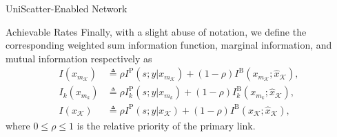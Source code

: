 \documentclass[journal]{IEEEtran}
\begin{document}
\begin{section}{UniScatter-Enabled Network}
\begin{subsection}{Achievable Rates}
		Finally, with a slight abuse of notation, we define the corresponding weighted sum information function, marginal information, and mutual information respectively as
		\begin{align}
			I(x_{m_{\mathcal{K}}})
			 & \triangleq \rho I^{\mathrm{P}}(s;y|x_{m_{\mathcal{K}}}) + (1 - \rho) I^{\mathrm{B}}(x_{m_{\mathcal{K}}};\hat{x}_{\mathcal{K}}),\label{eq:weighted_sum_information_function} \\
			I_k(x_{m_k})
			 & \triangleq \rho I^{\mathrm{P}}_{k}(s;y|x_{m_k}) + (1 - \rho) I^{\mathrm{B}}_{k}(x_{m_k};\hat{x}_{\mathcal{K}}),\label{eq:weighted_sum_marginal_information}                 \\
			I(x_{\mathcal{K}})
			 & \triangleq \rho I^{\mathrm{P}}(s;y|x_{\mathcal{K}}) + (1 - \rho) I^{\mathrm{B}}(x_{\mathcal{K}};\hat{x}_{\mathcal{K}}),\label{eq:weighted_sum_mutual_information}
		\end{align}
		where $0 \le \rho \le 1$ is the relative priority of the primary link.


	\end{subsection}
\end{section}
\end{document}
